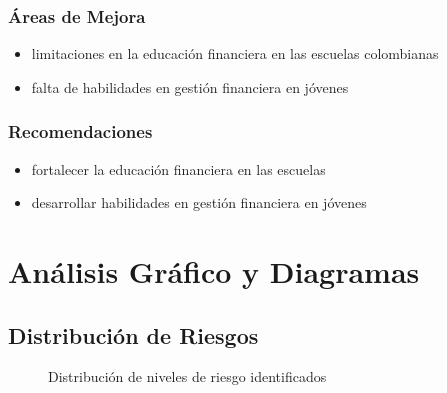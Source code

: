 \documentclass[11pt]{article}
\begin{document}
    \subsubsection{Áreas de Mejora}
    \begin{itemize}
        \item limitaciones en la educación financiera en las escuelas colombianas
    \item falta de habilidades en gestión financiera en jóvenes
\end{itemize}

    \subsubsection{Recomendaciones}
    \begin{itemize}
        \item fortalecer la educación financiera en las escuelas
    \item desarrollar habilidades en gestión financiera en jóvenes
\end{itemize}



\section{Análisis Gráfico y Diagramas}

\subsection{Distribución de Riesgos}
\begin{figure}[H]
    \centering
    \caption{Distribución de niveles de riesgo identificados}
\end{figure}
\end{document}
